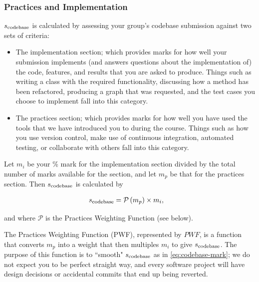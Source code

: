 \subsubsection{Practices and Implementation} \label{sec:practices-implementation-weight}

\newcommand{\PWF}[0]{\mathcal{P}}
\newcommand{\minWeight}[0]{0.4}
\newcommand{\maxWeight}[0]{1.1}
\newcommand{\markForMinWeight}[0]{0.2}
\newcommand{\markForMaxWeight}[0]{0.825}
\newcommand{\markForUnity}[0]{0.597}

$s_{\mathrm{codebase}}$ is calculated by assessing your group's codebase submission against two sets of criteria:

\begin{itemize}
  \item The implementation section; which provides marks for how well your submission implements (and answers questions about the implementation of) the code, features, and results that you are asked to produce. Things such as writing a class with the required functionality, discussing how a method has been refactored, producing a graph that was requested, and the test cases you choose to implement fall into this category.
  \item The practices section; which provides marks for how well you have used the tools that we have introduced you to during the course. Things such as how you use version control, make use of continuous integration, automated testing, or collaborate with others fall into this category.
\end{itemize}

Let $m_{i}$ be your \% mark for the implementation section divided by the total number of marks available for the section, and let $m_{p}$ be that for the practices section.
Then $s_{\mathrm{codebase}}$ is calculated by

\begin{align} \label{eq:codebase-mark}
  \codebaseGrade & = \PWF\left(m_p\right) \times m_i,
\end{align}

and where $\PWF$ is the Practices Weighting Function (see below).

The Practices Weighting Function (PWF), represented by $PWF$, is a function that converts $m_p$ into a weight that then multiples $m_i$ to give $s_{\mathrm{codebase}}$.
The purpose of this function is to ``smooth" $s_{\mathrm{codebase}}$ as in \eqref{eq:codebase-mark}; we do not expect you to be perfect straight way, and every software project will have design decisions or accidental commits that end up being reverted.

